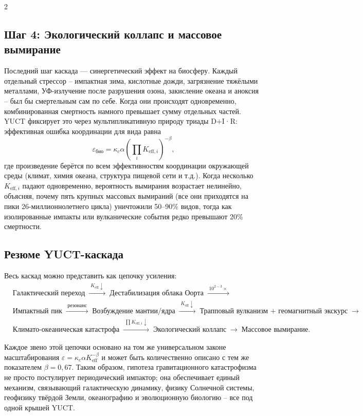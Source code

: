 \documentclass[11pt,a4paper]{article}
\begin{document}
\begin{multicols}{2}
		\subsection{Шаг 4: Экологический коллапс и массовое вымирание}
		
		Последний шаг каскада — синергетический эффект на биосферу.
		Каждый отдельный стрессор – импактная зима, кислотные дожди, загрязнение тяжёлыми металлами,
		УФ-излучение после разрушения озона, закисление океана и аноксия – был бы смертельным сам по себе.
		Когда они происходят одновременно, комбинированная смертность намного превышает сумму отдельных частей.
		YUCT фиксирует это через мультипликативную природу триады D+I·R:
		эффективная ошибка координации для вида равна
		\[
		\varepsilon_{\text{био}} = \kappa_c \alpha \left( \prod_{i} K_{\mathrm{eff},i} \right)^{-\beta},
		\]
		где произведение берётся по всем эффективностям координации окружающей среды
		(климат, химия океана, структура пищевой сети и т.д.). Когда несколько
		\(K_{\mathrm{eff},i}\) падают одновременно, вероятность вымирания возрастает
		нелинейно, объясняя, почему пять крупных массовых вымираний
		(все они приходятся на пики 26-миллионнолетнего цикла) уничтожили 50–90\% видов,
		тогда как изолированные импакты или вулканические события редко превышают 20\% смертности.
		
	\end{multicols}
	
	\subsection{Резюме YUCT-каскада}
	
	Весь каскад можно представить как цепочку усиления:
	{\small
		\[
		\begin{aligned}
			&\text{Галактический переход}
			\;\xrightarrow{\;K_{\mathrm{eff}}\downarrow\;}\;
			\text{Дестабилизация облака Оорта}
			\;\xrightarrow{\;10^{2-3}\times\;}\\
			&\text{Импактный пик}
			\;\xrightarrow{\;\text{резонанс}\;}\;
			\text{Возбуждение мантии/ядра}
			\;\xrightarrow{\;K_{\mathrm{eff}}\downarrow\;}\;
			\text{Трапповый вулканизм + геомагнитный экскурс}
			\;\xrightarrow{\;}\\
			&\text{Климато-океаническая катастрофа}
			\;\xrightarrow{\;\prod K_{\mathrm{eff},i}\downarrow\;}\;
			\text{Экологический коллапс}
			\;\xrightarrow{\;}\;
			\text{Массовое вымирание}.
		\end{aligned}
		\]
	}
	
	Каждое звено этой цепочки основано на том же универсальном законе масштабирования
	\(\varepsilon = \kappa_c \alpha K_{\mathrm{eff}}^{-\beta}\) и может быть количественно описано с тем же показателем
	\(\beta = 0,67\). Таким образом, гипотеза гравитационного катастрофизма не просто постулирует периодический импактор; она обеспечивает единый механизм, связывающий галактическую динамику, физику Солнечной системы, геофизику твёрдой Земли, океанографию и эволюционную биологию – все под одной крышей YUCT.
	
\end{document}
